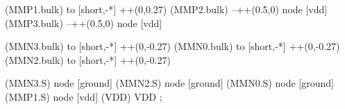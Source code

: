 \begin{circuitikz}[american]
	(MMP1.bulk) to [short,-*] ++(0,0.27)
	(MMP2.bulk) --++(0.5,0) node [vdd] {}
	(MMP3.bulk) --++(0.5,0) node [vdd] {}
	
	(MMN3.bulk) to [short,-*] ++(0,-0.27)
	(MMN0.bulk) to [short,-*] ++(0,-0.27)
	(MMN2.bulk) to [short,-*] ++(0,-0.27)	


	(MMN3.S) node [ground] {}
	(MMN2.S) node [ground] {}
	(MMN0.S) node [ground] {}
	(MMP1.S) node [vdd] (VDD) {VDD}
;

\end{circuitikz}
